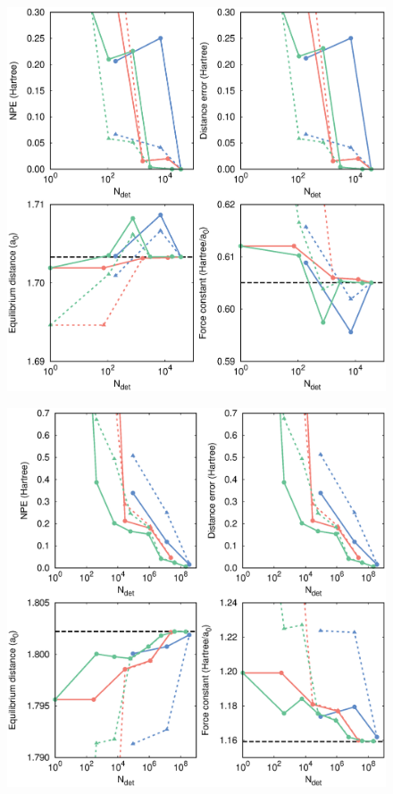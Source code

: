 \documentclass[aip,jcp,preprint,noshowkeys,superscriptaddress]{revtex4-1}
\begin{document}
\begin{figure}%
\includegraphics[width=1.0\linewidth]{plot_pt2_rpt2_H4}
\caption{
}
\label{fig:plot_pt2_rpt2_h4}
\end{figure}

\begin{figure}%
\includegraphics[width=1.0\linewidth]{plot_pt2_rpt2_H8}
\caption{
}
\label{fig:plot_pt2_rpt2_h8}
\end{figure}


\clearpage


\end{document}
